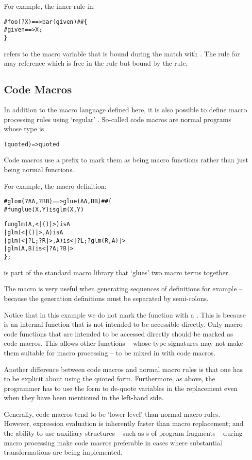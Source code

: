 For example, the inner rule in:
\begin{alltt}
# foo(?X) ==> bar(given) ## \{
  #given ==> X;
\}
\end{alltt}
refers to the macro variable  that is bound during the match with . The rule for  may reference  which is free in the  rule but bound by the  rule.

\subsection{Code Macros}
\label{codeMacros}
In addition to the macro language defined here, it is also possible to define macro processing rules using `regular' \Sr. So-called code macros are normal \Sr programs whose type is 
\begin{alltt}
(quoted)=>quoted
\end{alltt}
Code macros use a prefix \q{\#} to mark them as being macro functions rather than just being normal functions.

For example, the macro definition:
\begin{alltt}
\#glom(?AA,?BB) ==> glue(AA,BB) ## \{
    \#fun glue(X,Y) is glm(X,Y)
    
    fun glm(A,<|()|>) is A
     |  glm(<|()|>,A) is A
     |  glm(<|?L;?R|>,A) is <|?L;?glm(R,A)|>
     |  glm(A,B) is <|?A;?B|>
  \};
\end{alltt}
is part of the standard macro library that `glues' two macro terms together.
\begin{aside}
The  macro is very useful when generating sequences of definitions for example -- because the generation definitions must be separated by semi-colons.
\end{aside}
Notice that in this example we do not mark the  function with a \q{\#}. This is because  is an internal function that is not intended to be accessible directly. Only macro code functions that are intended to be accessed directly should be marked as code macros. This allows other functions -- whose type signatures may not make them suitable for macro processing -- to be mixed in with code macros.

Another difference between code macros and normal macro rules is that one has to be explicit about using the quoted form. Furthermore, as above, the programmer has to use the  form to de-quote variables in the replacement even when they have been mentioned in the left-hand side.

\begin{aside}
Generally, code macros tend to be `lower-level' than normal macro rules. However, expression evaluation is inherently faster than macro replacement; and the ability to use auxiliary structures -- such as s of program fragments -- during macro processing make code macros preferable in cases where substantial transformations are being implemented.
\end{aside}

